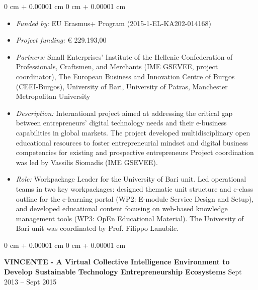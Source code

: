 \documentclass[10pt, a4paper]{article}
\newenvironment{highlights}{
    \begin{itemize}[
        topsep=0.10 cm,
        parsep=0.10 cm,
        partopsep=0pt,
        itemsep=0pt,
        leftmargin=0 cm + 10pt
    ]
}{
    \end{itemize}
} %
\newenvironment{onecolentry}{
    \begin{adjustwidth}{
        0 cm + 0.00001 cm
    }{
        0 cm + 0.00001 cm
    }
}{
    \end{adjustwidth}
} %
\newenvironment{twocolentry}[2][]{
    \onecolentry
    \def\secondColumn{#2}
    \setcolumnwidth{\fill, 4.5 cm}
    \begin{paracol}{2}
}{
    \switchcolumn \raggedleft \secondColumn
    \end{paracol}
    \endonecolentry
} %
\begin{document}
        \vspace{0.10 cm}
        \begin{onecolentry}
            \begin{highlights}
                \item \textit{Funded by:} EU Erasmus+ Program (2015-1-EL-KA202-014168)
                \item \textit{Project funding:} € 229.193,00
                \item \textit{Partners:} Small Enterprises’ Institute of the Hellenic Confederation of Professionals, Craftsmen, and Merchants (IME GSEVEE, project coordinator), The European Business and Innovation Centre of Burgos (CEEI-Burgos), University of Bari, University of Patras, Manchester Metropolitan University
                \item \textit{Description:} International project aimed at addressing the critical gap between entrepreneurs' digital technology needs and their e-business capabilities in global markets. The project developed multidisciplinary open educational resources to foster entrepreneurial mindset and digital business competencies for existing and prospective entrepreneurs Project coordination was led by Vassilis Siomadis (IME GSEVEE).
                \item \textit{Role:} Workpackage Leader for the University of Bari unit. Led operational teams in two key workpackages: designed thematic unit structure and e-class outline for the e-learning portal (WP2: E-module Service Design and Setup), and developed educational content focusing on web-based knowledge management tools (WP3: OpEn Educational Material). The University of Bari unit was coordinated by Prof. Filippo Lanubile.
            \end{highlights}
        \end{onecolentry}


        \vspace{0.2 cm}

        \begin{twocolentry}{
            Sept 2013 – Sept 2015
        }
            \textbf{VINCENTE - A Virtual Collective Intelligence Environment to Develop Sustainable Technology Entrepreneurship Ecosystems}\end{twocolentry}
\end{document}
